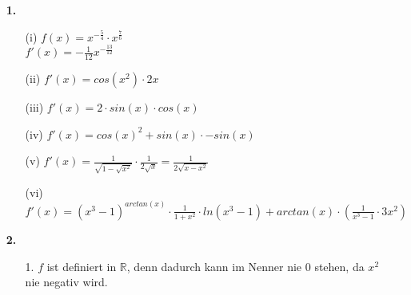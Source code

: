 \documentclass[a4paper,11pt]{scrartcl}
\author{\authorinfo}
\title{\titleinfo}
\date{\today}
\begin{document}
\maketitle
\begin{enumerate}
    \item[\textbf{1.}]
        \begin{enumerate}
            \item[(i)]
                \(f(x) = x^{-\frac{5}{4}} \cdot x^\frac{7}{6}\) \\
                \(f'(x)= -\frac{1}{12}x^{-\frac{13}{12}}\)
            \item[(ii)]
                \(f'(x)= cos(x^2) \cdot 2x\)
            \item[(iii)]
                \(f'(x)= 2 \cdot sin(x) \cdot cos(x)\)
            \item[(iv)]
                \(f'(x)= cos(x)^2 + sin(x) \cdot - sin(x)\)
            \item[(v)]
                \(f'(x)= \frac{1}{\sqrt{1-\sqrt{x^2}}} \cdot \frac{1}{2 \sqrt{x}} = \frac{1}{2 \sqrt{x-x^2}}\)
            \item[(vi)]
                \(f'(x)= (x^3 - 1)^{arctan(x)} \cdot \frac{1}{1+x^2} \cdot ln(x^3 - 1) + arctan(x) \cdot \left( \frac{1}{x^3-1} \cdot 3x^2 \right) \)
        \end{enumerate}

    \item[\textbf{2.}]
        \begin{enumerate}
            \item[1.]
                $f$ ist definiert in $\mathbb{R}$, denn dadurch kann im Nenner nie
                $0$ stehen, da $x^2$ nie negativ wird.


\end{enumerate}
\end{enumerate}
\end{document}

